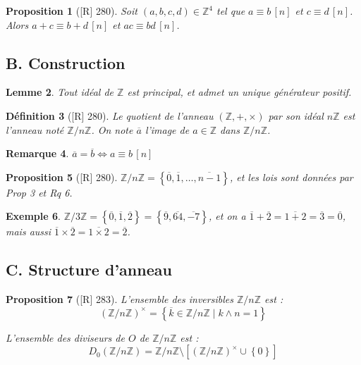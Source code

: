 \documentclass[10pt, a4paper, parskip=full, twoside, twocolumn]{report}
\newtheorem{definition}{Définition}
\newtheorem{proposition}[definition]{Proposition}
\newtheorem{lemma}[definition]{Lemme}
\newtheorem{example}[definition]{Exemple}
\newtheorem{remark}[definition]{Remarque}
\newcommand{\IZ}{\mathbb{Z}}
\newcommand{\IZnZ}{\mathbb{Z}/n\mathbb{Z}}
\begin{document}
\begin{proposition}[\textnormal{[R] 280}]
	Soit $(a,b,c,d)\in\IZ^4$ tel que $a\equiv b\,[n]$ et $c\equiv d\,[n]$.
	Alors $a+c\equiv b+d\,[n]$ et $ac\equiv bd \,[n]$.
\end{proposition}

\subsection*{B. Construction}
\begin{lemma}
	Tout idéal de $\IZ$ est principal, et admet un unique générateur positif.
\end{lemma}

\begin{definition}[\textnormal{[R] 280}]
	Le quotient de l'anneau $(\IZ, +,\times)$ par son idéal $n\IZ$ est l'anneau noté $\IZnZ$. On note $\overline{a}$ l'image de $a\in\IZ$ dans $\IZnZ$.
\end{definition}

\begin{remark}
	$\overline{a} = \overline{b} \iff a\equiv b\,[n]$
\end{remark}

\begin{proposition}[\textnormal{[R] 280}]
	$\IZnZ = \left\{\overline{0},\overline{1},\dots,\overline{n-1}\right\}$, et les lois sont données par Prop 3 et Rq 6.
\end{proposition}

\begin{example}
	$\IZ/3\IZ = \left\{\overline{0},\overline{1},\overline{2}\right\} =\left\{\overline{9},\overline{64},\overline{-7}\right\}$,
	et on a $\overline{1}+\overline{2}=\overline{1+2}=\overline{3}=\overline{0}$, mais aussi $\overline{1}\times\overline{2} = \overline{1\times 2}=\overline{2}$.
\end{example}

\subsection*{C. Structure d'anneau}
\begin{proposition}[\textnormal{[R] 283}]
	L'ensemble des inversibles $\IZnZ$ est :
	$$\left(\IZnZ\right)^{\times} = \left\{\overline{k}\in\IZnZ\mid k\wedge n = 1\right\}$$

	L'ensemble des diviseurs de $O$ de $\IZnZ$ est :
	$$D_0\left(\IZnZ\right) = \IZnZ \setminus \left[\left(\IZnZ\right)^{\times}\cup \left\{0\right\}\right]$$
\end{proposition}
\end{document}
